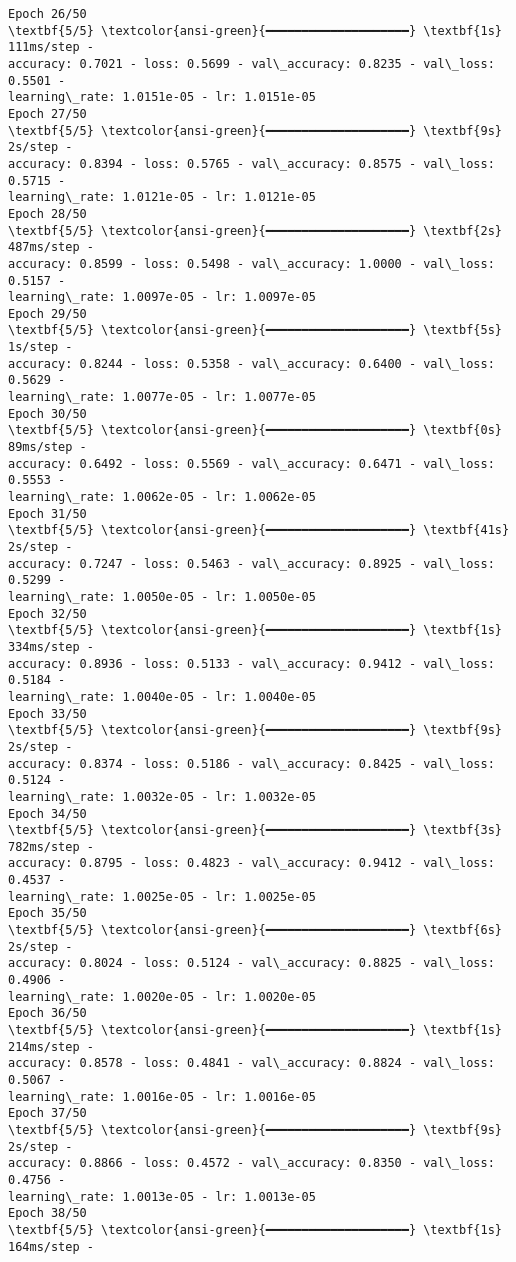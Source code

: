\documentclass[11pt]{article}
\begin{document}
\begin{Verbatim}[commandchars=\\\{\}]
Epoch 26/50
\textbf{5/5} \textcolor{ansi-green}{━━━━━━━━━━━━━━━━━━━━} \textbf{1s} 111ms/step -
accuracy: 0.7021 - loss: 0.5699 - val\_accuracy: 0.8235 - val\_loss: 0.5501 -
learning\_rate: 1.0151e-05 - lr: 1.0151e-05
Epoch 27/50
\textbf{5/5} \textcolor{ansi-green}{━━━━━━━━━━━━━━━━━━━━} \textbf{9s} 2s/step -
accuracy: 0.8394 - loss: 0.5765 - val\_accuracy: 0.8575 - val\_loss: 0.5715 -
learning\_rate: 1.0121e-05 - lr: 1.0121e-05
Epoch 28/50
\textbf{5/5} \textcolor{ansi-green}{━━━━━━━━━━━━━━━━━━━━} \textbf{2s} 487ms/step -
accuracy: 0.8599 - loss: 0.5498 - val\_accuracy: 1.0000 - val\_loss: 0.5157 -
learning\_rate: 1.0097e-05 - lr: 1.0097e-05
Epoch 29/50
\textbf{5/5} \textcolor{ansi-green}{━━━━━━━━━━━━━━━━━━━━} \textbf{5s} 1s/step -
accuracy: 0.8244 - loss: 0.5358 - val\_accuracy: 0.6400 - val\_loss: 0.5629 -
learning\_rate: 1.0077e-05 - lr: 1.0077e-05
Epoch 30/50
\textbf{5/5} \textcolor{ansi-green}{━━━━━━━━━━━━━━━━━━━━} \textbf{0s} 89ms/step -
accuracy: 0.6492 - loss: 0.5569 - val\_accuracy: 0.6471 - val\_loss: 0.5553 -
learning\_rate: 1.0062e-05 - lr: 1.0062e-05
Epoch 31/50
\textbf{5/5} \textcolor{ansi-green}{━━━━━━━━━━━━━━━━━━━━} \textbf{41s} 2s/step -
accuracy: 0.7247 - loss: 0.5463 - val\_accuracy: 0.8925 - val\_loss: 0.5299 -
learning\_rate: 1.0050e-05 - lr: 1.0050e-05
Epoch 32/50
\textbf{5/5} \textcolor{ansi-green}{━━━━━━━━━━━━━━━━━━━━} \textbf{1s} 334ms/step -
accuracy: 0.8936 - loss: 0.5133 - val\_accuracy: 0.9412 - val\_loss: 0.5184 -
learning\_rate: 1.0040e-05 - lr: 1.0040e-05
Epoch 33/50
\textbf{5/5} \textcolor{ansi-green}{━━━━━━━━━━━━━━━━━━━━} \textbf{9s} 2s/step -
accuracy: 0.8374 - loss: 0.5186 - val\_accuracy: 0.8425 - val\_loss: 0.5124 -
learning\_rate: 1.0032e-05 - lr: 1.0032e-05
Epoch 34/50
\textbf{5/5} \textcolor{ansi-green}{━━━━━━━━━━━━━━━━━━━━} \textbf{3s} 782ms/step -
accuracy: 0.8795 - loss: 0.4823 - val\_accuracy: 0.9412 - val\_loss: 0.4537 -
learning\_rate: 1.0025e-05 - lr: 1.0025e-05
Epoch 35/50
\textbf{5/5} \textcolor{ansi-green}{━━━━━━━━━━━━━━━━━━━━} \textbf{6s} 2s/step -
accuracy: 0.8024 - loss: 0.5124 - val\_accuracy: 0.8825 - val\_loss: 0.4906 -
learning\_rate: 1.0020e-05 - lr: 1.0020e-05
Epoch 36/50
\textbf{5/5} \textcolor{ansi-green}{━━━━━━━━━━━━━━━━━━━━} \textbf{1s} 214ms/step -
accuracy: 0.8578 - loss: 0.4841 - val\_accuracy: 0.8824 - val\_loss: 0.5067 -
learning\_rate: 1.0016e-05 - lr: 1.0016e-05
Epoch 37/50
\textbf{5/5} \textcolor{ansi-green}{━━━━━━━━━━━━━━━━━━━━} \textbf{9s} 2s/step -
accuracy: 0.8866 - loss: 0.4572 - val\_accuracy: 0.8350 - val\_loss: 0.4756 -
learning\_rate: 1.0013e-05 - lr: 1.0013e-05
Epoch 38/50
\textbf{5/5} \textcolor{ansi-green}{━━━━━━━━━━━━━━━━━━━━} \textbf{1s} 164ms/step -

\end{Verbatim}
\end{document}
